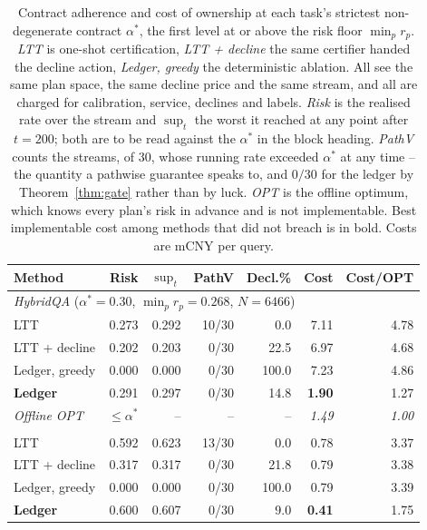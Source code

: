\begin{table}[t]
\centering
\caption{Contract adherence and cost of ownership at each task's strictest non-degenerate contract $\alpha^{*}$, the first level at or above the risk floor $\min_p r_p$. \emph{LTT} is one-shot certification, \emph{LTT + decline} the same certifier handed the decline action, \emph{Ledger, greedy} the deterministic ablation. All see the same plan space, the same decline price and the same stream, and all are charged for calibration, service, declines and labels. \emph{Risk} is the realised rate over the stream and $\sup_t$ the worst it reached at any point after $t=200$; both are to be read against the $\alpha^{*}$ in the block heading. \emph{PathV} counts the streams, of $30$, whose running rate exceeded $\alpha^{*}$ at any time -- the quantity a pathwise guarantee speaks to, and $0/30$ for the ledger by Theorem~\ref{thm:gate} rather than by luck. \emph{OPT} is the offline optimum, which knows every plan's risk in advance and is not implementable. Best implementable cost among methods that did not breach is in bold. Costs are mCNY per query.}
\label{tab:main}
\footnotesize
\setlength{\tabcolsep}{2.4pt}
\begin{tabular}{lrrrrrr}
\toprule
Method & Risk & $\sup_t$ & PathV & Decl.\% & Cost & Cost/OPT \\
\midrule
\multicolumn{7}{l}{\textit{HybridQA} ($\alpha^{*}=0.30$, $\min_p r_p=0.268$, $N=6466$)} \\
\quad LTT & 0.273 & 0.292 & 10/30 & 0.0 & 7.11 & 4.78 \\
\quad LTT + decline & 0.202 & 0.203 & 0/30 & 22.5 & 6.97 & 4.68 \\
\quad Ledger, greedy & 0.000 & 0.000 & 0/30 & 100.0 & 7.23 & 4.86 \\
\quad \textbf{Ledger} & 0.291 & 0.297 & 0/30 & 14.8 & \textbf{1.90} & 1.27 \\
\quad \textit{Offline OPT} & $\le\alpha^{*}$ & -- & -- & -- & \textit{1.49} & \textit{1.00} \\
\addlinespace[3pt]
\multicolumn{7}{l}{\textit{CRAG} ($\alpha^{*}=0.62$, $\min_p r_p=0.591$, $N=2006$)} \\
\quad LTT & 0.592 & 0.623 & 13/30 & 0.0 & 0.78 & 3.37 \\
\quad LTT + decline & 0.317 & 0.317 & 0/30 & 21.8 & 0.79 & 3.38 \\
\quad Ledger, greedy & 0.000 & 0.000 & 0/30 & 100.0 & 0.79 & 3.39 \\
\quad \textbf{Ledger} & 0.600 & 0.607 & 0/30 & 9.0 & \textbf{0.41} & 1.75 \\

\end{tabular}
\end{table}
